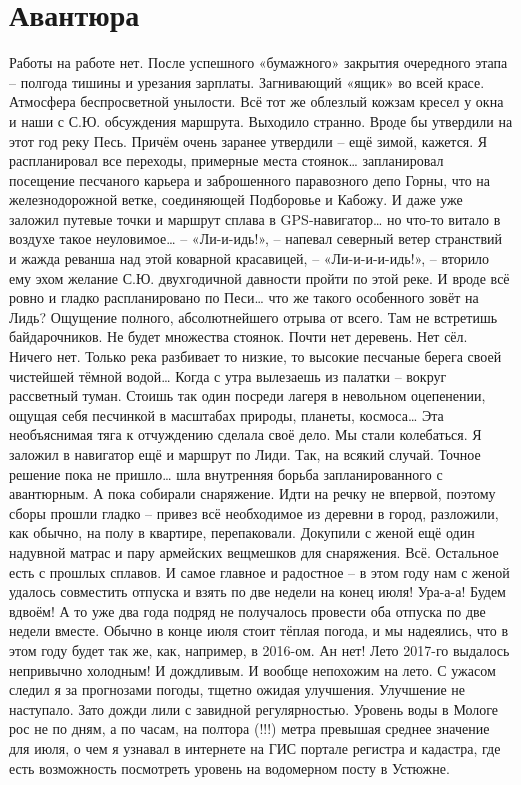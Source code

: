 \chapter{Авантюра} 

Работы на работе нет. После успешного «бумажного» закрытия очередного этапа – полгода тишины и урезания зарплаты. Загнивающий «ящик» во всей красе. Атмосфера беспросветной унылости. Всё тот же облезлый кожзам кресел у окна и наши с С.Ю. обсуждения маршрута. Выходило странно. Вроде бы утвердили на этот год реку Песь. Причём очень заранее утвердили – ещё зимой, кажется. Я распланировал все переходы, примерные места стоянок… запланировал посещение песчаного карьера и заброшенного паравозного депо Горны, что на железнодорожной ветке, соединяющей Подборовье и Кабожу. И даже уже заложил путевые точки и маршрут сплава в GPS-навигатор… но что-то витало в воздухе такое неуловимое… 
– «Ли-и-идь!», – напевал северный ветер странствий и жажда реванша над этой коварной красавицей, – «Ли-и-и-и-идь!», – вторило ему эхом желание С.Ю. двухгодичной давности пройти по этой реке. И вроде всё ровно и гладко распланировано по Песи… что же такого особенного зовёт на Лидь? Ощущение полного, абсолютнейшего отрыва от всего. Там не встретишь байдарочников. Не будет множества стоянок. Почти нет деревень. Нет сёл. Ничего нет. Только река разбивает то низкие, то высокие песчаные берега своей чистейшей тёмной водой… Когда с утра вылезаешь из палатки – вокруг рассветный туман. Стоишь так один посреди лагеря в невольном оцепенении, ощущая себя песчинкой в масштабах природы, планеты, космоса…
Эта необъяснимая тяга к отчуждению сделала своё дело. Мы стали колебаться. Я заложил в навигатор ещё и маршрут по Лиди. Так, на всякий случай. Точное решение пока не пришло… шла внутренняя борьба запланированного с авантюрным.
А пока собирали снаряжение. Идти на речку не впервой, поэтому сборы прошли гладко – привез всё необходимое из деревни в город, разложили, как обычно, на полу в квартире, перепаковали. Докупили с женой ещё один надувной матрас и пару армейских вещмешков для снаряжения. Всё. Остальное есть с прошлых сплавов. И самое главное и радостное – в этом году нам с женой удалось совместить отпуска и взять по две недели на конец июля! Ура-а-а! Будем вдвоём! А то уже два года подряд не получалось провести оба отпуска по две недели вместе.
Обычно в конце июля стоит тёплая погода, и мы надеялись, что в этом году будет так же, как, например, в 2016-ом. Ан нет! Лето 2017-го выдалось непривычно холодным! И дождливым. И вообще непохожим на лето. С ужасом следил я за прогнозами погоды, тщетно ожидая улучшения. Улучшение не наступало. Зато дожди лили с завидной регулярностью. Уровень воды в Мологе рос не по дням, а по часам, на полтора (!!!) метра превышая среднее значение для июля, о чем я узнавал в интернете на ГИС портале регистра и кадастра, где есть возможность посмотреть уровень на водомерном посту в Устюжне. 
